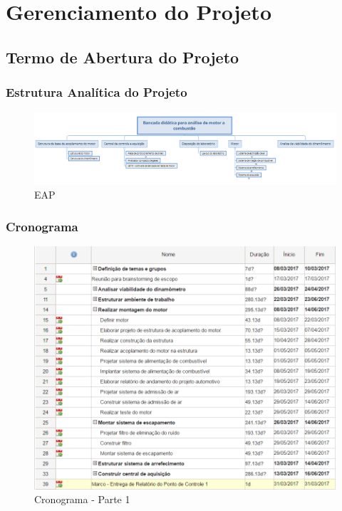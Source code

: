 \chapter[Gerenciamento do Projeto]{Gerenciamento do Projeto}

\section{Termo de Abertura do Projeto}

\subsection{Estrutura Analítica do Projeto}

\begin{figure}[!htbp]
	\centering
	\includegraphics[scale=0.56, angle = 90]{figuras/EAP.PNG}
	\caption{EAP}
	\label{eap}
\end{figure}

\pagebreak

\subsection{Cronograma}

\begin{figure}[!htbp]
	\centering
	\includegraphics[keepaspectratio=true,scale= 0.8]{figuras/cronograma-PI2-parte1.PNG}
	\caption{Cronograma - Parte 1}
	\label{eap}
\end{figure}

